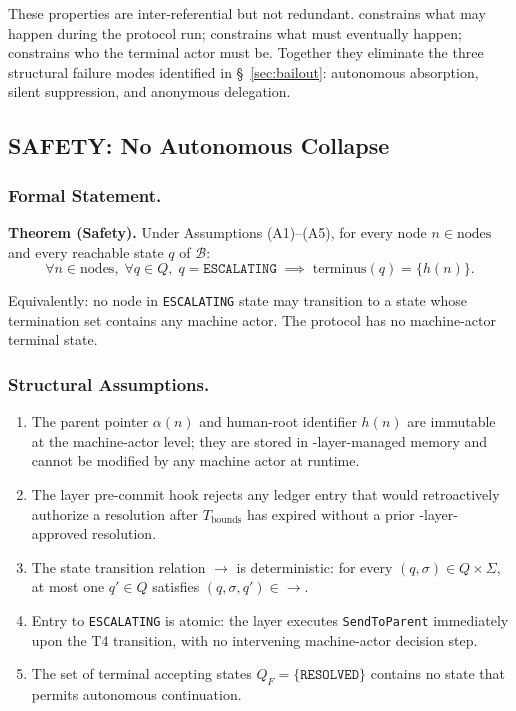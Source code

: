These properties are inter-referential but not redundant. \SAFETY{} constrains what may happen during the protocol run; \LIVENESS{} constrains what must eventually happen; \ACCOUNTABILITY{} constrains who the terminal actor must be. Together they eliminate the three structural failure modes identified in \S~\ref{sec:bailout}: autonomous absorption, silent suppression, and anonymous delegation.

\subsection{SAFETY: No Autonomous Collapse}

\subsubsection{Formal Statement.}

\begin{bluebox}
\textbf{Theorem (Safety).} Under Assumptions (A1)--(A5), for every node $n \in \text{nodes}$ and every reachable state $q$ of $\mathcal{B}$:
\[
\forall n \in \text{nodes},\; \forall q \in Q,\; q = \texttt{ESCALATING} \; \implies \; \text{terminus}(q) = \{h(n)\}.
\tag{SAFETY}
\]

Equivalently: no \bxthree{} node in \texttt{ESCALATING} state may transition to a state whose termination set contains any machine actor. The protocol has no machine-actor terminal state.
\end{bluebox}

\subsubsection{Structural Assumptions.}

\begin{enumerate}
\item[(A1)] The parent pointer $\alpha(n)$ and human-root identifier $h(n)$ are immutable at the machine-actor level; they are stored in \fact-layer-managed memory and cannot be modified by any machine actor at runtime.
\item[(A2)] The \fact{} layer pre-commit hook rejects any ledger entry that would retroactively authorize a resolution after $T_{\text{bounds}}$ has expired without a prior \fact-layer-approved resolution.
\item[(A3)] The state transition relation $\rightarrow$ is deterministic: for every $(q, \sigma) \in Q \times \Sigma$, at most one $q' \in Q$ satisfies $(q, \sigma, q') \in \rightarrow$.
\item[(A4)] Entry to \texttt{ESCALATING} is atomic: the \fact{} layer executes \texttt{SendToParent} immediately upon the T4 transition, with no intervening machine-actor decision step.
\item[(A5)] The set of terminal accepting states $Q_F = \{\texttt{RESOLVED}\}$ contains no state that permits autonomous continuation.
\end{enumerate}

